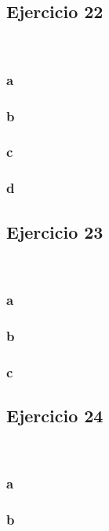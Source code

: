 \documentclass{article}
\begin{document}
\subsection*{Ejercicio 22}

\

\subsubsection*{a}

\subsubsection*{b}

\subsubsection*{c}

\subsubsection*{d}

\subsection*{Ejercicio 23}

\

\subsubsection*{a}

\subsubsection*{b}

\subsubsection*{c}

\subsection*{Ejercicio 24}

\

\subsubsection*{a}

\subsubsection*{b}
\end{document}
